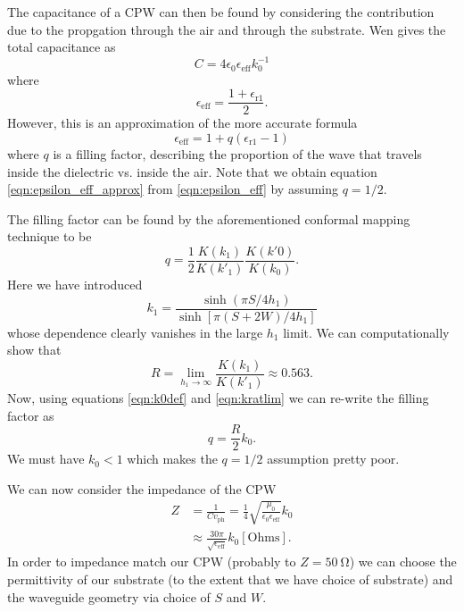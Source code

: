 \documentclass[a4paper]{article}
\begin{document}
The capacitance of a CPW can then be found by considering the contribution due
to the propgation through the air and through the substrate. Wen gives the
total capacitance as
\begin{equation}
  C = 4\epsilon_0\epsilon_\mathrm{eff} k_0^{-1}
\end{equation}
where
\begin{equation}
  \epsilon_\mathrm{eff} = \frac{1 + \epsilon_\mathrm{r1}}{2}.
  \label{eqn:epsilon_eff_approx}
\end{equation}
However, this is an approximation of the more accurate formula
\begin{equation}
  \epsilon_\mathrm{eff} = 1 + q(\epsilon_\mathrm{r1} - 1)
  \label{eqn:epsilon_eff}
\end{equation}
where $q$ is a filling factor, describing the proportion of the wave that
travels inside the dielectric vs. inside the air. Note that we obtain equation
\ref{eqn:epsilon_eff_approx} from \ref{eqn:epsilon_eff} by assuming $q = 1/2$.

The filling factor can be found by the aforementioned conformal mapping
technique to be
\begin{equation}
  q = \frac{1}{2}\frac{K(k_1)}{K(k'_1)}\frac{K(k'0)}{K(k_0)}.
  \label{eqn:fillfact}
\end{equation}
Here we have introduced
\begin{equation*}
  k_1 = \frac{\sinh (\pi S/ 4h_1)}{\sinh [\pi (S+2W)/4h_1]}
\end{equation*}
whose dependence clearly vanishes in the large $h_1$ limit. We can
computationally show that
\begin{equation}
  R = \lim_{h_1 \to \infty} \frac{K(k_1)}{K(k'_1)} \approx 0.563.
  \label{eqn:kratlim}
\end{equation}
Now, using equations \ref{eqn:k0def} and \ref{eqn:kratlim} we can re-write the
filling factor as
\begin{equation}
  q = \frac{R}{2}k_0.
\end{equation}
We must have $k_0 < 1$ which makes the $q=1/2$ assumption pretty poor.

We can now consider the impedance of the CPW
\begin{align}
  Z &= \frac{1}{C v_\mathrm{ph}} = \frac{1}{4}\sqrt{\frac{\mu_0}{\epsilon_0
    \epsilon_\mathrm{eff}}}k_0 \\
    &\approx \frac{30\pi}{\sqrt{\epsilon_\mathrm{eff}}}k_0 \mathrm{[Ohms]}.
\end{align}
In order to impedance match our CPW (probably to $Z=\SI{50}{\ohm}$) we can choose
the permittivity of our substrate (to the extent that we have choice of
substrate) and the waveguide geometry via choice of $S$ and $W$.
\end{document}
